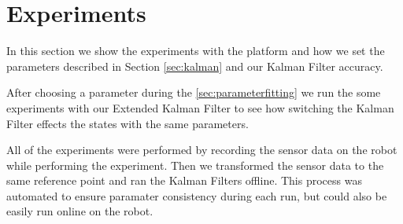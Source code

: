 \documentclass[class=report, crop=false]{standalone}
\begin{document}
\chapter{Experiments}

In this section we show the experiments with the platform and how we set the parameters described in Section \ref{sec:kalman} and our Kalman Filter accuracy.

After choosing a parameter during the \ref{sec:parameterfitting} we run the some experiments with our Extended Kalman Filter to see how switching the Kalman Filter effects the states with the same parameters.

All of the experiments were performed by recording the sensor data on the robot while performing the experiment. Then we transformed the sensor data to the same reference point and ran the Kalman Filters offline. This process was automated to ensure paramater consistency during each run, but could also be easily run online on the robot.




\end{document}
